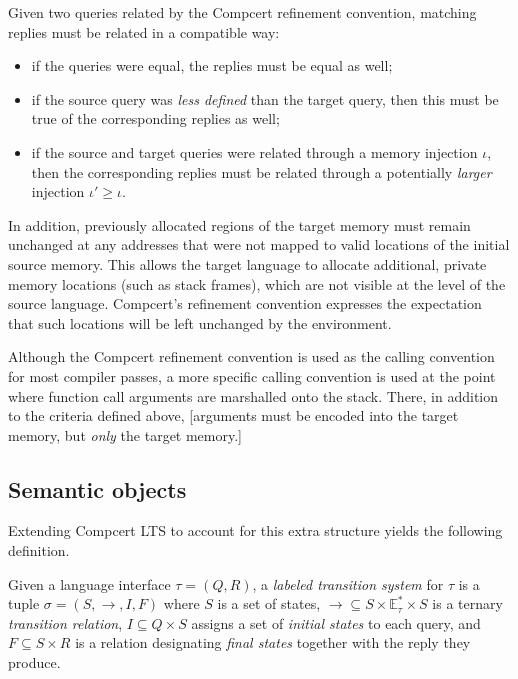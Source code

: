 \documentclass[sigplan,10pt,review,anonymous]{acmart}
\begin{document}
Given two queries related by
the Compcert refinement convention,
matching replies
must be related in a compatible way:
\begin{itemize}
\item if the queries were equal,
  the replies must be equal as well;
\item if the source query was
  \emph{less defined} than the target query,
  then this must be true of the corresponding
  replies as well;
\item if the source and target queries
  were related through a memory injection $\iota$,
  then the corresponding replies
  must be related through a potentially \emph{larger}
  injection $\iota' \ge \iota$.
\end{itemize}
In addition,
previously allocated regions of the target memory
must remain unchanged
at any addresses that were not mapped to valid locations
of the initial source memory.
This allows the target language to allocate additional,
private memory locations (such as stack frames),
which are not visible at the level of the source language.
Compcert's refinement convention
expresses the expectation that such locations
will be left unchanged by the environment.

Although the Compcert refinement convention is used as
the calling convention for most compiler passes,
a more specific calling convention is used
at the point where function call arguments
are marshalled onto the stack.
There,
in addition to the criteria defined above,
[arguments must be encoded into the target memory,
but \emph{only} the target memory.]


\subsection{Semantic objects} %

Extending Compcert LTS to account for
this extra structure yields the following definition.

\begin{definition}
Given a language interface $\tau = (Q, R)$,
a \emph{labeled transition system} for $\tau$
is a tuple $\sigma = (S, \rightarrow, I, F)$ where
$S$ is a set of states,
${\rightarrow} \subseteq S \times \mathbb{E}_\tau^* \times S$
is a ternary \emph{transition relation},
$I \subseteq Q \times S$
assigns a set of \emph{initial states} to each query, and
$F \subseteq S \times R$
is a relation designating \emph{final states}
together with the reply they produce.
\end{definition}
\end{document}
